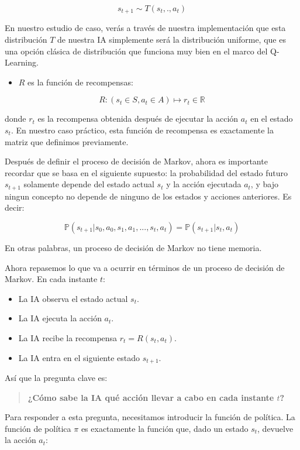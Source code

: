 \documentclass[
]{book}
\providecommand{\tightlist}{%
  \setlength{\itemsep}{0pt}\setlength{\parskip}{0pt}}
\begin{document}
\[s_{t+1} \sim T(s_t,.,a_t)\]

En nuestro estudio de caso, verás a través de nuestra implementación que esta distribución \(T\) de nuestra IA simplemente será la distribución uniforme, que es una opción clásica de distribución que funciona muy bien en el marco del Q-Learning.

\begin{itemize}
\tightlist
\item
  \(R\) es la función de recompensas:
\end{itemize}

\[R : (s_t \in S, a_t \in A) \mapsto r_t \in \mathbb{R}\]

donde \(r_t\) es la recompensa obtenida después de ejecutar la acción \(a_t\) en el estado \(s_t\). En nuestro caso práctico, esta función de recompensa es exactamente la matriz que definimos previamente.

Después de definir el proceso de decisión de Markov, ahora es importante recordar que se basa en el siguiente supuesto: la probabilidad del estado futuro \(s_{t + 1}\) solamente depende del estado actual \(s_t\) y la acción ejecutada \(a_t\), y bajo ningun concepto no depende de ninguno de los estados y acciones anteriores. Es decir:

\[\mathbb{P}(s_{t+1}|s_0,a_0,s_1,a_1,...,s_t,a_t) = \mathbb{P}(s_{t+1}|s_t,a_t)\]

En otras palabras, un proceso de decisión de Markov no tiene memoria.

\newpage

Ahora repasemos lo que va a ocurrir en términos de un proceso de decisión de Markov. En cada instante \(t\):

\begin{itemize}
\tightlist
\item
  La IA observa el estado actual \(s_t\).
\item
  La IA ejecuta la acción \(a_t\).
\item
  La IA recibe la recompensa \(r_t = R(s_t, a_t)\).
\item
  La IA entra en el siguiente estado \(s_{t+1}\).
\end{itemize}

Así que la pregunta clave es:

\begin{quote}
\textbf{¿Cómo sabe la IA qué acción llevar a cabo en cada instante \(t\)?}
\end{quote}

Para responder a esta pregunta, necesitamos introducir la función de política. La función de política \(\pi\) es exactamente la función que, dado un estado \(s_t\), devuelve la acción \(a_t\):
\end{document}
